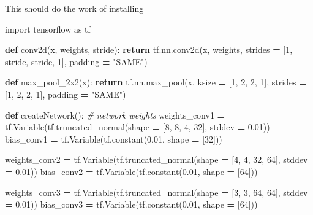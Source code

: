 \documentclass[]{article}
\newenvironment{Shaded}{\begin{snugshade}}{\end{snugshade}}
\newcommand{\KeywordTok}[1]{\textcolor[rgb]{0.13,0.29,0.53}{\textbf{#1}}}
\newcommand{\DecValTok}[1]{\textcolor[rgb]{0.00,0.00,0.81}{#1}}
\newcommand{\FloatTok}[1]{\textcolor[rgb]{0.00,0.00,0.81}{#1}}
\newcommand{\StringTok}[1]{\textcolor[rgb]{0.31,0.60,0.02}{#1}}
\newcommand{\ImportTok}[1]{#1}
\newcommand{\CommentTok}[1]{\textcolor[rgb]{0.56,0.35,0.01}{\textit{#1}}}
\newcommand{\ControlFlowTok}[1]{\textcolor[rgb]{0.13,0.29,0.53}{\textbf{#1}}}
\newcommand{\OperatorTok}[1]{\textcolor[rgb]{0.81,0.36,0.00}{\textbf{#1}}}
\newcommand{\NormalTok}[1]{#1}
\begin{document}
This should do the work of installing

\begin{Shaded}
\begin{Highlighting}[]
\ImportTok{import}\NormalTok{ tensorflow }\ImportTok{as}\NormalTok{ tf}

\KeywordTok{def}\NormalTok{ conv2d(x, weights, stride):}
    \ControlFlowTok{return}\NormalTok{ tf.nn.conv2d(x, weights, strides }\OperatorTok{=}\NormalTok{ [}\DecValTok{1}\NormalTok{, stride, stride, }\DecValTok{1}\NormalTok{], padding }\OperatorTok{=} \StringTok{"SAME"}\NormalTok{)}

\KeywordTok{def}\NormalTok{ max_pool_2x2(x):}
    \ControlFlowTok{return}\NormalTok{ tf.nn.max_pool(x, ksize }\OperatorTok{=}\NormalTok{ [}\DecValTok{1}\NormalTok{, }\DecValTok{2}\NormalTok{, }\DecValTok{2}\NormalTok{, }\DecValTok{1}\NormalTok{], strides }\OperatorTok{=}\NormalTok{ [}\DecValTok{1}\NormalTok{, }\DecValTok{2}\NormalTok{, }\DecValTok{2}\NormalTok{, }\DecValTok{1}\NormalTok{], padding }\OperatorTok{=} \StringTok{"SAME"}\NormalTok{)}

\KeywordTok{def}\NormalTok{ createNetwork():}
    \CommentTok{# network weights}
\NormalTok{    weights_conv1 }\OperatorTok{=}\NormalTok{ tf.Variable(tf.truncated_normal(shape }\OperatorTok{=}\NormalTok{ [}\DecValTok{8}\NormalTok{, }\DecValTok{8}\NormalTok{, }\DecValTok{4}\NormalTok{, }\DecValTok{32}\NormalTok{], stddev }\OperatorTok{=} \FloatTok{0.01}\NormalTok{))}
\NormalTok{    bias_conv1 }\OperatorTok{=}\NormalTok{ tf.Variable(tf.constant(}\FloatTok{0.01}\NormalTok{, shape }\OperatorTok{=}\NormalTok{ [}\DecValTok{32}\NormalTok{]))}

\NormalTok{    weights_conv2 }\OperatorTok{=}\NormalTok{ tf.Variable(tf.truncated_normal(shape }\OperatorTok{=}\NormalTok{ [}\DecValTok{4}\NormalTok{, }\DecValTok{4}\NormalTok{, }\DecValTok{32}\NormalTok{, }\DecValTok{64}\NormalTok{], stddev }\OperatorTok{=} \FloatTok{0.01}\NormalTok{))}
\NormalTok{    bias_conv2 }\OperatorTok{=}\NormalTok{ tf.Variable(tf.constant(}\FloatTok{0.01}\NormalTok{, shape }\OperatorTok{=}\NormalTok{ [}\DecValTok{64}\NormalTok{]))}

\NormalTok{    weights_conv3 }\OperatorTok{=}\NormalTok{ tf.Variable(tf.truncated_normal(shape }\OperatorTok{=}\NormalTok{ [}\DecValTok{3}\NormalTok{, }\DecValTok{3}\NormalTok{, }\DecValTok{64}\NormalTok{, }\DecValTok{64}\NormalTok{], stddev }\OperatorTok{=} \FloatTok{0.01}\NormalTok{))}
\NormalTok{    bias_conv3 }\OperatorTok{=}\NormalTok{ tf.Variable(tf.constant(}\FloatTok{0.01}\NormalTok{, shape }\OperatorTok{=}\NormalTok{ [}\DecValTok{64}\NormalTok{]))}


\end{Highlighting}
\end{Shaded}
\end{document}
